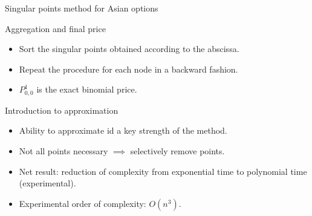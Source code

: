 \documentclass[utf8,t,xcolor=svgnames]{beamer}
\begin{document}
\begin{frame}{Singular points method for Asian options}
	\begin{block}{Aggregation and final price}
		\begin{itemize}
			\item Sort the singular points obtained according to the abscissa.
			\item Repeat the procedure for each node in a backward fashion.
			\item $ P_{0,0}^1 $ is the exact binomial price.
		\end{itemize}
	\end{block}
	\begin{block}{Introduction to approximation}
		\begin{itemize}
			\item Ability to approximate id a key strength of the method.
			\item Not all points necessary $ \implies $ selectively remove points.
			\item Net result: reduction of complexity from exponential time to polynomial time (experimental).
			\item Experimental order of complexity: $ O(n^3) $.
		\end{itemize}
	\end{block}
\end{frame}
\end{document}
